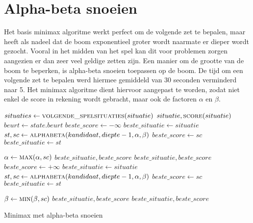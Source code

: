 \section{Alpha-beta snoeien}
Het basis minimax algoritme werkt perfect om de volgende zet te bepalen, maar heeft als nadeel dat de boom exponentieel groter wordt naarmate er dieper wordt gezocht. Vooral in het midden van het spel kan dit voor problemen zorgen aangezien er dan zeer veel geldige zetten zijn.  Een manier om de grootte van de boom te beperken, is alpha-beta snoeien toepassen op de boom. De tijd om een volgende zet te bepalen werd hiermee gemiddeld van 30 seconden verminderd naar 5. Het minimax algoritme dient hiervoor aangepast te worden, zodat niet enkel de score in rekening wordt gebracht, maar ook de factoren $\alpha$ en $\beta$.

\begin{algorithm}
	\begin{algorithmic}[1]
			\State $situaties \gets \Call{volgende\_spelsituaties}{situatie}$
				\State \Return $situatie, \Call{score}{situatie}$
			\EndIf
			\State $beurt \gets state.beurt$
				\State $beste\_score \gets -\infty$
				\State $beste\_situatie \gets situatie$
					\State $st, sc \gets \Call{alphabeta}{kandidaat, diepte-1, \alpha, \beta}$
						\State $beste\_score \gets sc$
						\State $beste\_situatie \gets st$

						\State $\alpha \gets \Call{max}{\alpha, sc}$
						\If{$\beta \leq \alpha$}
							\State \Return $beste\_situatie, beste\_score$
						\EndIf
					\EndIf
				\EndFor
				\State \Return $beste\_situatie, beste\_score$
			\Else
				\State $beste\_score \gets +\infty$
				\State $beste\_situatie \gets situatie$
					\State $st, sc \gets \Call{alphabeta}{kandidaat, diepte-1, \alpha, \beta}$
						\State $beste\_score \gets sc$
						\State $beste\_situatie \gets st$

						\State $\beta \gets \Call{min}{\beta, sc}$
						\If{$\beta \leq \alpha$}
							\State \Return $beste\_situatie, beste\_score$
						\EndIf
					\EndIf
				\EndFor
				\State \Return $beste\_situatie, beste\_score$
			\EndIf
		\EndFunction
	\end{algorithmic}
	\caption{Minimax met alpha-beta snoeien}
\end{algorithm}

